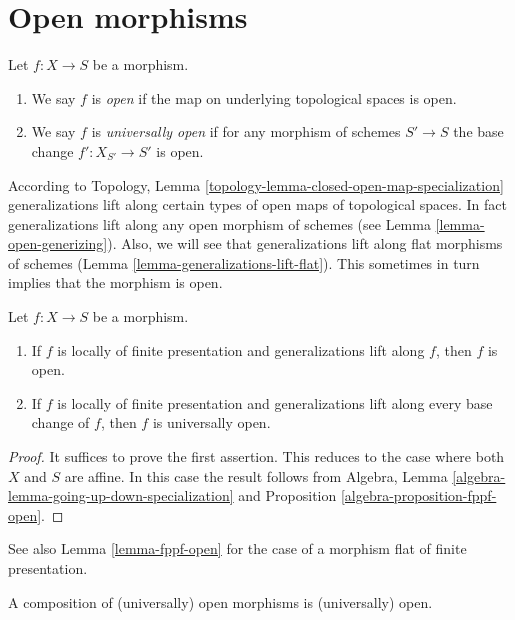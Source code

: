 \section{Open morphisms}
\label{section-open}

\begin{definition}
\label{definition-open}
Let $f : X \to S$ be a morphism.
\begin{enumerate}
\item We say $f$ is {\it open} if the map on underlying
topological spaces is open.
\item We say $f$ is {\it universally open} if for any morphism of
schemes $S' \to S$ the base change $f' : X_{S'} \to S'$ is open.
\end{enumerate}
\end{definition}

\noindent
According to
Topology, Lemma \ref{topology-lemma-closed-open-map-specialization}
generalizations lift along certain types of open maps of topological
spaces. In fact generalizations lift along any open morphism of schemes
(see
Lemma \ref{lemma-open-generizing}).
Also, we will see that generalizations lift along flat morphisms
of schemes (Lemma \ref{lemma-generalizations-lift-flat}).
This sometimes in turn implies that the morphism is open.

\begin{lemma}
\label{lemma-locally-finite-presentation-universally-open}
Let $f : X \to S$ be a morphism.
\begin{enumerate}
\item If $f$ is locally of finite presentation and generalizations lift
along $f$, then $f$ is open.
\item If $f$ is locally of finite presentation and generalizations lift
along every base change of $f$, then $f$ is universally open.
\end{enumerate}
\end{lemma}

\begin{proof}
It suffices to prove the first assertion.
This reduces to the case where both $X$ and $S$ are affine.
In this case the result follows from
Algebra, Lemma \ref{algebra-lemma-going-up-down-specialization}
and Proposition \ref{algebra-proposition-fppf-open}.
\end{proof}

\noindent
See also Lemma \ref{lemma-fppf-open} for the case of a morphism
flat of finite presentation.

\begin{lemma}
\label{lemma-composition-open}
A composition of (universally) open morphisms is (universally) open.
\end{lemma}

